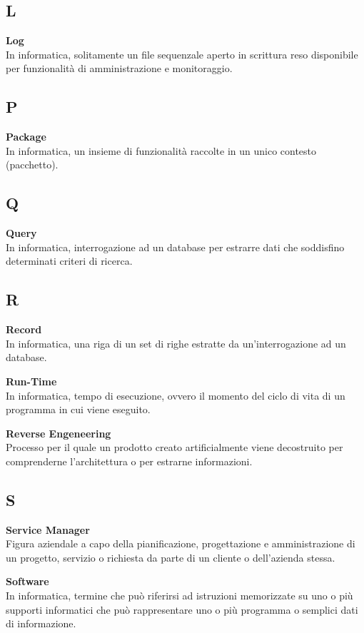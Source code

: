 \subsection*{L}
\textbf{Log}\\
In informatica, solitamente un file sequenzale aperto in scrittura reso disponibile per funzionalità di amministrazione e monitoraggio.
\subsection*{P}
\textbf{Package}\\
In informatica, un insieme di funzionalità raccolte in un unico contesto (pacchetto).

\subsection*{Q}
\textbf{Query}\\
In informatica, interrogazione ad un database per estrarre dati che soddisfino determinati criteri di ricerca.

\subsection*{R}
\textbf{Record}\\
In informatica, una riga di un set di righe estratte da un'interrogazione ad un database.

\textbf{Run-Time}\\
In informatica, tempo di esecuzione, ovvero il momento del ciclo di vita di un programma in cui viene eseguito.

\textbf{Reverse Engeneering}\\
Processo per il quale un prodotto creato artificialmente viene decostruito per comprenderne l'architettura o per estrarne informazioni.

\subsection*{S}
\textbf{Service Manager}\\
Figura aziendale a capo della pianificazione, progettazione e amministrazione di un progetto, servizio o richiesta da parte di un cliente o dell'azienda stessa.

\textbf{Software}\\
In informatica, termine che può riferirsi ad istruzioni memorizzate su uno o più supporti informatici che può rappresentare uno o più programma o semplici dati di informazione.